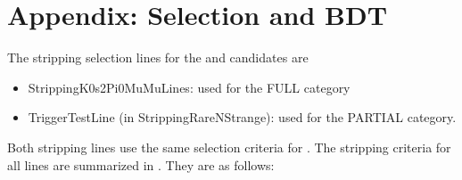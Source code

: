 \clearpage
\newpage
\section{Appendix: Selection and BDT}
\label{app:selection}


The stripping selection lines for the \KsPzMuMu and \Kspipi candidates are
\begin{itemize}
 \item StrippingK0s2Pi0MuMuLines: used for the FULL \KsPzMuMu category
 \item TriggerTestLine (in StrippingRareNStrange): used for the PARTIAL \KsPzMuMu category.
\end{itemize}
Both stripping lines use the same selection criteria for \Kspipi. 
The stripping criteria for all lines are summarized in . They are as follows:
